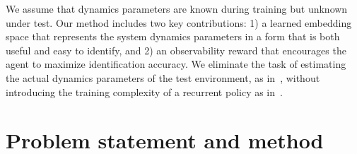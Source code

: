 \documentclass{article}
\newcommand{\sysid}{dynamics}
\begin{document}
We assume that \sysid{} parameters are known during training but unknown under test.
Our method includes two key contributions:
1) a learned embedding space that represents the system \sysid{} parameters
in a form that is both useful and easy to identify,
and 2) an observability reward that encourages the agent to maximize identification accuracy.
We eliminate the task of
estimating the actual \sysid{} parameters of the test environment,
as in~\citep{yu-up-osi-rss17},
without introducing the training complexity of a recurrent policy as in~\citep{peng-dynamics-randomization-corr17}.


\vspace{-0.2cm}
\section{Problem statement and method}
\label{problem-method}
\vspace{-0.2cm}
\end{document}
